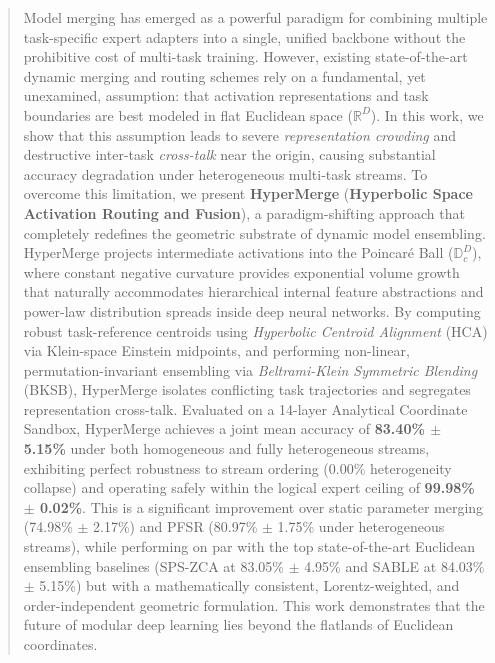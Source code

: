 \begin{abstract}
Model merging has emerged as a powerful paradigm for combining multiple task-specific expert adapters into a single, unified backbone without the prohibitive cost of multi-task training. However, existing state-of-the-art dynamic merging and routing schemes rely on a fundamental, yet unexamined, assumption: that activation representations and task boundaries are best modeled in flat Euclidean space ($\mathbb{R}^D$). In this work, we show that this assumption leads to severe \emph{representation crowding} and destructive inter-task \emph{cross-talk} near the origin, causing substantial accuracy degradation under heterogeneous multi-task streams. 
To overcome this limitation, we present \textbf{HyperMerge} (\textbf{Hyperbolic Space Activation Routing and Fusion}), a paradigm-shifting approach that completely redefines the geometric substrate of dynamic model ensembling. HyperMerge projects intermediate activations into the Poincaré Ball ($\mathbb{D}_c^D$), where constant negative curvature provides exponential volume growth that naturally accommodates hierarchical internal feature abstractions and power-law distribution spreads inside deep neural networks. By computing robust task-reference centroids using \emph{Hyperbolic Centroid Alignment} (HCA) via Klein-space Einstein midpoints, and performing non-linear, permutation-invariant ensembling via \emph{Beltrami-Klein Symmetric Blending} (BKSB), HyperMerge isolates conflicting task trajectories and segregates representation cross-talk. 
Evaluated on a 14-layer Analytical Coordinate Sandbox, HyperMerge achieves a joint mean accuracy of \textbf{83.40\% $\pm$ 5.15\%} under both homogeneous and fully heterogeneous streams, exhibiting perfect robustness to stream ordering (0.00\% heterogeneity collapse) and operating safely within the logical expert ceiling of \textbf{99.98\% $\pm$ 0.02\%}. This is a significant improvement over static parameter merging (74.98\% $\pm$ 2.17\%) and PFSR (80.97\% $\pm$ 1.75\% under heterogeneous streams), while performing on par with the top state-of-the-art Euclidean ensembling baselines (SPS-ZCA at 83.05\% $\pm$ 4.95\% and SABLE at 84.03\% $\pm$ 5.15\%) but with a mathematically consistent, Lorentz-weighted, and order-independent geometric formulation. This work demonstrates that the future of modular deep learning lies beyond the flatlands of Euclidean coordinates.
\end{abstract}
